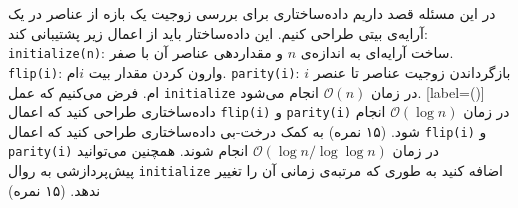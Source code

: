 در این مسئله قصد داریم داده‌ساختاری برای بررسی زوجیت یک بازه از عناصر در یک آرایه‌ی بیتی طراحی کنیم. این داده‌ساختار باید از اعمال زیر پشتیبانی کند:
 \texttt{initialize(n)}: ساخت آرایه‌ای به اندازه‌ی $ n $ و مقداردهی عناصر آن با صفر.
 \texttt{flip(i)}: وارون کردن مقدار بیت $ i$ام.
 \texttt{parity(i)}: بازگرداندن زوجیت عناصر تا عنصر $ i $ام.
فرض می‌کنیم که عمل \texttt{initialize} در زمان $ \mathcal{O}(n) $ انجام می‌شود.
[label=(\alph*)]
 داده‌ساختاری طراحی کنید که اعمال \texttt{flip(i)} و \texttt{parity(i)} در زمان $ \mathcal{O}(\log{n}) $ انجام شود. (۱۵ نمره)
 به کمک درخت-بی داده‌ساختاری طراحی کنید که اعمال \texttt{flip(i)} و \texttt{parity(i)} در زمان $ \mathcal{O}(\log{n}/\log{\log{n}}) $ انجام شوند. همچنین می‌توانید پیش‌پردازشی به روال \texttt{initialize} اضافه کنید به طوری که مرتبه‌ی زمانی آن را تغییر ندهد. (۱۵ نمره)
